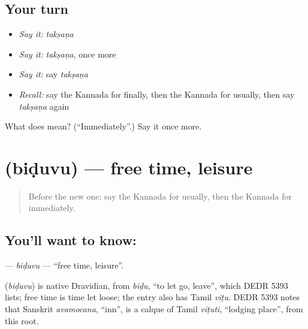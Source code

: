\subsection*{Your turn}
\begin{itemize}
\raggedright
  \item \emph{Say it:} \emph{takṣaṇa}
  \item \emph{Say it:} \emph{takṣaṇa}, once more
  \item \emph{Say it:} say \emph{takṣaṇa}
  \item \emph{Recall:} say the Kannada for finally, then the Kannada for usually, then say \emph{takṣaṇa} again
\end{itemize}

\begin{tcolorbox}[breakable,colback=teal!4,colframe=teal!35!black,title={Before you move on}]
What does  mean? (\textquotedblleft{}Immediately\textquotedblright{}.) Say it once more.
\end{tcolorbox}
\section[\texorpdfstring{\kn{ಬಿಡುವು} (biḍuvu)}{ಬಿಡುವು (biḍuvu)}]{ (biḍuvu) — free time, leisure}

\label{lesson:KA-C210-biduvu}



\begin{quote}
Before the new one: say the Kannada for usually, then the Kannada for immediately.
\end{quote}

\subsection*{You'll want to know: }
\textbf{} — \emph{biḍuvu} — \textquotedblleft{}free time, leisure\textquotedblright{}.

\begin{cousinweb}
\textbf{} (\emph{biḍuvu}) is native Dravidian, from \emph{biḍu}, \textquotedblleft{}to let go, leave\textquotedblright{}, which DEDR 5393 lists; free time is time let loose; the entry also has Tamil \emph{viṭu}. DEDR 5393 notes that Sanskrit \emph{avamocana}, \textquotedblleft{}inn\textquotedblright{}, is a calque of Tamil \emph{viṭuti}, \textquotedblleft{}lodging place\textquotedblright{}, from this root.
\end{cousinweb}


